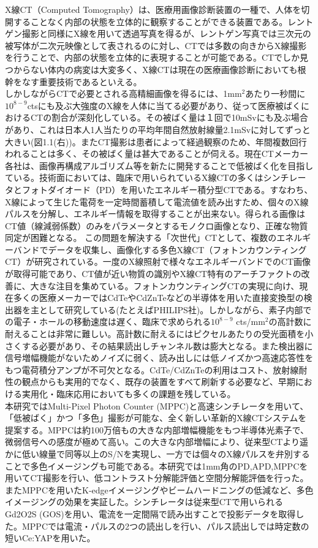 \begin{jabstract}
X線CT（Computed Tomography）は、医療用画像診断装置の一種で、人体を切開することなく内部の状態を立体的に観察することができる装置である。レントゲン撮影と同様にX線を用いて透過写真を得るが、レントゲン写真では三次元の被写体が二次元映像として表されるのに対し、CTでは多数の向きからX線撮影を行うことで、内部の状態を立体的に表現することが可能である。CTでしか見つからない体内の病変は大変多く、X線CTは現在の医療画像診断においても根幹をなす重要技術であるといえる。\\
しかしながらCTで必要とされる高精細画像を得るには、1mm$^2$あたり一秒間に$10^{8-9}$ctsにも及ぶ大強度のX線を人体に当てる必要があり、従って医療被ばくにおけるCTの割合が深刻化している。その被ばく量は１回で10mSvにも及ぶ場合があり、これは日本人1人当たりの平均年間自然放射線量2.1mSvに対してずっと大きい(図1.1(右))。またCT撮影は患者によって経過観察のため、年間複数回行われることは多く、その被ばく量は甚大であることが伺える。現在CTメーカー各社は、画像再構成アルゴリズム等を新たに開発することで低被ばく化を目指している。技術面においては、臨床で用いられているX線CTの多くはシンチレータとフォトダイオード（PD）を用いたエネルギー積分型CTである。すなわち、X線によって生じた電荷を一定時間蓄積して電流値を読み出すため、個々のX線パルスを分解し、エネルギー情報を取得することが出来ない。得られる画像はCT値（線減弱係数）のみをパラメータとするモノクロ画像となり、正確な物質同定が困難となる。
この問題を解決する「次世代」CTとして、複数のエネルギーバンドでデータを収集し、画像化する多色X線CT（フォトンカウンティングCT）が研究されている。一度のX線照射で様々なエネルギーバンドでのCT画像が取得可能であり、CT値が近い物質の識別やX線CT特有のアーチファクトの改善に、大きな注目を集めている。フォトンカウンティングCTの実現に向け、現在多くの医療メーカーではCdTeやCdZnTeなどの半導体を用いた直接変換型の検出器を主として研究している(たとえばPHILIPS社)。しかしながら、素子内部での電子・ホールの移動速度は遅く、臨床で求められる$10^{8-9}$ cts/mm$^2$の高計数に耐えることは非常に難しい。高計数に耐えるにはピクセルあたりの受光面積を小さくする必要があり、その結果読出しチャンネル数は膨大となる。また検出器に信号増幅機能がないためノイズに弱く、読み出しには低ノイズかつ高速応答性をもつ電荷積分アンプが不可欠となる。CdTe/CdZnTeの利用はコスト、放射線耐性の観点からも実用的でなく、既存の装置をすべて刷新する必要など、早期における実用化・臨床応用においても多くの課題を残している。\\
本研究ではMulti-Pixel Photon Counter (MPPC)と高速シンチレータを用いて、「低被ばく」かつ「多色」撮影が可能な、全く新しい革新的X線CTシステムを提案する。MPPCは約100万倍もの大きな内部増幅機能をもつ半導体光素子で、微弱信号への感度が極めて高い。この大きな内部増幅により、従来型CTより遥かに低い線量で同等以上のS/Nを実現し、一方では個々のX線パルスを弁別することで多色イメージングも可能である。本研究では1mm角のPD,APD,MPPCを用いてCT撮影を行い、低コントラスト分解能評価と空間分解能評価を行った。またMPPCを用いたK-edgeイメージングやビームハードニングの低減など、多色イメージングの効果を実証した。シンチレータは従来型CTで用いられるGd2O2S (GOS)を用い、電流を一定間隔で読み出すことで投影データを取得した。MPPCでは電流・パルスの2つの読出しを行い、パルス読出しでは時定数の短いCe:YAPを用いた。
\end{jabstract}

